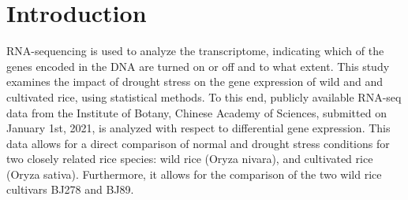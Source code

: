 \section{Introduction}

RNA-sequencing is used to analyze the transcriptome, indicating which of the genes encoded in the DNA are turned on or off and to what extent. This study examines the impact of drought stress on the gene expression of wild and and cultivated rice, using statistical methods. To this end, publicly available RNA-seq data from the Institute of Botany, Chinese Academy of Sciences, submitted on January 1st, 2021, is analyzed with respect to differential gene expression. This data allows for a direct comparison of normal and drought stress conditions for two closely related rice species: wild rice (Oryza nivara), and cultivated rice (Oryza sativa). Furthermore, it allows for the comparison of the two wild rice cultivars BJ278 and BJ89.